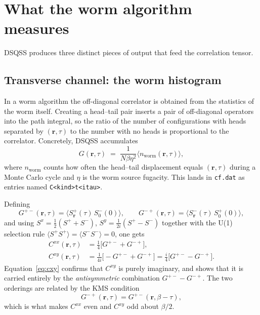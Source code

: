 \documentclass[11pt,a4paper]{article}
\newcommand{\Sp}{S^{+}}
\newcommand{\Sm}{S^{-}}
\newcommand{\Gpm}{G^{+-}}
\newcommand{\Gmp}{G^{-+}}
\newcommand{\code}[1]{\texttt{#1}}
\begin{document}
\section{What the worm algorithm measures}
\label{sec:estimators}

DSQSS produces three distinct pieces of output that feed the correlation tensor.

\subsection{Transverse channel: the worm histogram}

In a worm algorithm the off-diagonal correlator is obtained from the statistics
of the worm itself. Creating a head--tail pair inserts a pair of off-diagonal
operators into the path integral, so the ratio of the number of configurations
with heads separated by $(\mathbf{r},\tau)$ to the number with no heads is
proportional to the correlator. Concretely, DSQSS accumulates
\begin{equation}
  G(\mathbf{r},\tau) \;=\; \frac{1}{N\beta\eta^2}
     \bigl\langle n_{\text{worm}}(\mathbf{r},\tau) \bigr\rangle ,
\end{equation}
where $n_{\text{worm}}$ counts how often the head--tail displacement equals
$(\mathbf{r},\tau)$ during a Monte Carlo cycle and $\eta$ is the worm source
fugacity. This lands in \code{cf.dat} as entries named
\code{C<kind>t<itau>}.

Defining
\begin{equation}
  \Gpm(\mathbf{r},\tau) = \bigl\langle \Sp_{\mathbf r}(\tau)\,\Sm_0(0)\bigr\rangle,
  \qquad
  \Gmp(\mathbf{r},\tau) = \bigl\langle \Sm_{\mathbf r}(\tau)\,\Sp_0(0)\bigr\rangle,
\end{equation}
and using $S^x=\tfrac12(\Sp+\Sm)$, $S^y=\tfrac1{2i}(\Sp-\Sm)$ together with the
U(1) selection rule $\langle \Sp\Sp\rangle=\langle \Sm\Sm\rangle=0$, one gets
\begin{align}
  C^{xx}(\mathbf{r},\tau) &= \tfrac14\bigl[\Gpm + \Gmp\bigr],
  \label{eq:cxx}\\[0.3em]
  C^{xy}(\mathbf{r},\tau) &= \frac{1}{4i}\bigl[-\Gpm + \Gmp\bigr]
                           = \frac{i}{4}\bigl[\Gpm - \Gmp\bigr].
  \label{eq:cxy}
\end{align}
Equation~\eqref{eq:cxy} confirms that $C^{xy}$ is purely imaginary, and shows
that it is carried entirely by the \emph{antisymmetric} combination
$\Gpm-\Gmp$. The two orderings are related by the KMS condition
\begin{equation}
  \Gmp(\mathbf{r},\tau) = \Gpm(\mathbf{r},\beta-\tau),
  \label{eq:kms}
\end{equation}
which is what makes $C^{xx}$ even and $C^{xy}$ odd about $\beta/2$.
\end{document}
